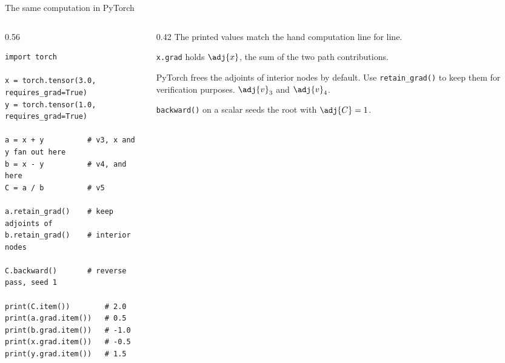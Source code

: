 \documentclass[aspectratio=169,xcolor=dvipsnames,svgnames,x11names,fleqn]{beamer}
\begin{document}
\begin{frame}[fragile]{The same computation in PyTorch}
\begin{columns}[T]
\begin{column}{0.56\textwidth}
\begin{lstlisting}[style=adpython]
import torch

x = torch.tensor(3.0, requires_grad=True)
y = torch.tensor(1.0, requires_grad=True)

a = x + y          # v3, x and y fan out here
b = x - y          # v4, and here
C = a / b          # v5

a.retain_grad()    # keep adjoints of
b.retain_grad()    # interior nodes

C.backward()       # reverse pass, seed 1

print(C.item())        # 2.0
print(a.grad.item())   # 0.5
print(b.grad.item())   # -1.0
print(x.grad.item())   # -0.5
print(y.grad.item())   # 1.5
\end{lstlisting}
\end{column}
\begin{column}{0.42\textwidth}
\small
The printed values match the hand computation line for line.

\medskip
\texttt{x.grad} holds $\adj{x}$, the sum of the two path
contributions.

\medskip
PyTorch frees the adjoints of interior nodes by default.
Use \texttt{retain\_grad()} to keep them for verification purposes.
$\adj{v}_3$ and $\adj{v}_4$.

\medskip
\texttt{backward()} on a scalar seeds the root with $\adj{C} = 1$.
\end{column}
\end{columns}
\end{frame}
\end{document}

